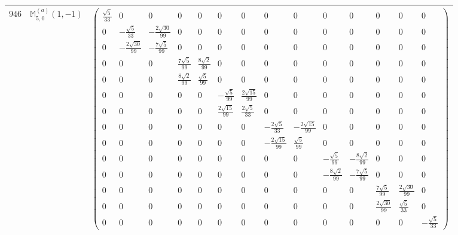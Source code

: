 \documentclass[fleqn,8pt,landscape]{jsarticle}
\begin{document}
\begin{center}
\begin{longtable}{ccc}
$ 946 $ & $ \mathbb{M}_{5,0}^{(a)}(1,-1) $ & $ \begin{pmatrix} \frac{\sqrt{5}}{33} & 0 & 0 & 0 & 0 & 0 & 0 & 0 & 0 & 0 & 0 & 0 & 0 & 0 \\ 0 & - \frac{\sqrt{5}}{33} & - \frac{2 \sqrt{30}}{99} & 0 & 0 & 0 & 0 & 0 & 0 & 0 & 0 & 0 & 0 & 0 \\ 0 & - \frac{2 \sqrt{30}}{99} & - \frac{7 \sqrt{5}}{99} & 0 & 0 & 0 & 0 & 0 & 0 & 0 & 0 & 0 & 0 & 0 \\ 0 & 0 & 0 & \frac{7 \sqrt{5}}{99} & \frac{8 \sqrt{2}}{99} & 0 & 0 & 0 & 0 & 0 & 0 & 0 & 0 & 0 \\ 0 & 0 & 0 & \frac{8 \sqrt{2}}{99} & \frac{\sqrt{5}}{99} & 0 & 0 & 0 & 0 & 0 & 0 & 0 & 0 & 0 \\ 0 & 0 & 0 & 0 & 0 & - \frac{\sqrt{5}}{99} & \frac{2 \sqrt{15}}{99} & 0 & 0 & 0 & 0 & 0 & 0 & 0 \\ 0 & 0 & 0 & 0 & 0 & \frac{2 \sqrt{15}}{99} & \frac{2 \sqrt{5}}{33} & 0 & 0 & 0 & 0 & 0 & 0 & 0 \\ 0 & 0 & 0 & 0 & 0 & 0 & 0 & - \frac{2 \sqrt{5}}{33} & - \frac{2 \sqrt{15}}{99} & 0 & 0 & 0 & 0 & 0 \\ 0 & 0 & 0 & 0 & 0 & 0 & 0 & - \frac{2 \sqrt{15}}{99} & \frac{\sqrt{5}}{99} & 0 & 0 & 0 & 0 & 0 \\ 0 & 0 & 0 & 0 & 0 & 0 & 0 & 0 & 0 & - \frac{\sqrt{5}}{99} & - \frac{8 \sqrt{2}}{99} & 0 & 0 & 0 \\ 0 & 0 & 0 & 0 & 0 & 0 & 0 & 0 & 0 & - \frac{8 \sqrt{2}}{99} & - \frac{7 \sqrt{5}}{99} & 0 & 0 & 0 \\ 0 & 0 & 0 & 0 & 0 & 0 & 0 & 0 & 0 & 0 & 0 & \frac{7 \sqrt{5}}{99} & \frac{2 \sqrt{30}}{99} & 0 \\ 0 & 0 & 0 & 0 & 0 & 0 & 0 & 0 & 0 & 0 & 0 & \frac{2 \sqrt{30}}{99} & \frac{\sqrt{5}}{33} & 0 \\ 0 & 0 & 0 & 0 & 0 & 0 & 0 & 0 & 0 & 0 & 0 & 0 & 0 & - \frac{\sqrt{5}}{33} \end{pmatrix} $ \\ \hline

\end{longtable}
\end{center}
\end{document}
